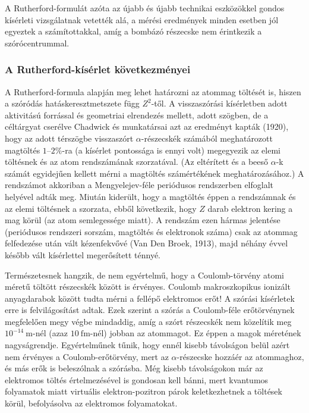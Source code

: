 \documentclass[a4paper,12pt]{article}
\begin{document}
A Rutherford-formulát azóta az újabb és újabb technikai eszközökkel
gondos kísérleti vizsgálatnak vetették alá, a mérési eredmények minden
esetben jól egyeztek a számítottakkal, amíg a bombázó részecske nem
érintkezik a szórócentrummal.

\subsubsection{A Rutherford-kísérlet következményei}
A Rutherford-formula alapján meg lehet határozni az atommag töltését is,
hiszen a szóródás hatáskeresztmetszete függ $Z^2$-től.
A visszaszórási kísérletben adott aktivitású forrással és geometriai
elrendezés mellett, adott szögben, de a céltárgyat cserélve Chadwick
és munkatársai azt az eredményt kapták (1920), hogy az adott térszögbe
visszaszórt $\alpha$-részecskék számából meghatározott magtöltés
$1$--$2\%$-ra (a kísérlet pontossága is ennyi volt) megegyezik
az elemi töltésnek és az atom rendszámának szorzatával.
(Az eltérített és a beeső $\alpha$-k számát egyidejűen kellett mérni a
magtöltés számértékének meghatározásához.)
A rendszámot akkoriban a Mengyelejev-féle periódusos rendszerben elfoglalt
helyével adták meg.
Miután kiderült, hogy a magtöltés éppen a rendszámnak és az elemi
töltésnek a szorzata, ebből következik, hogy $Z$ darab elektron kering
a mag körül (az atom semlegessége miatt).
A rendszám ezen hármas jelentése (periódusos rendszeri sorszám,
magtöltés és elektronok száma) csak az atommag felfedezése után vált
kézenfekvővé (Van Den Broek, 1913), majd néhány évvel később vált
kísérlettel megerősített ténnyé.

Természetesnek hangzik, de nem egyértelmű, hogy a Coulomb-törvény atomi
méretű töltött részecskék között is érvényes.
Coulomb makroszkopikus ionizált anyagdarabok között tudta mérni a
fellépő elektromos erőt!
A szórási kísérletek erre is felvilágosítást adtak.
Ezek szerint a szórás a Coulomb-féle erőtörvénynek megfelelően megy végbe
mindaddig, amíg a szórt részecskék nem közelítik meg
$10^{-14}\ \mathrm{m}$-nél (azaz $10\ \mathrm{fm}$-nél) jobban az atommagot.
Ez éppen a magok méretének nagyságrendje.
Egyértelműnek tűnik, hogy ennél kisebb távolságon belül azért nem
érvényes a Coulomb-erőtörvény, mert az $\alpha$-részecske hozzáér az
atommaghoz, és más erők is beleszólnak a szórásba.
Még kisebb távolságokon már az elektromos töltés értelmezésével is
gondosan kell bánni, mert kvantumos folyamatok miatt virtuális
elektron-pozitron párok keletkezhetnek a töltések körül, befolyásolva
az elektromos folyamatokat.
\end{document}
